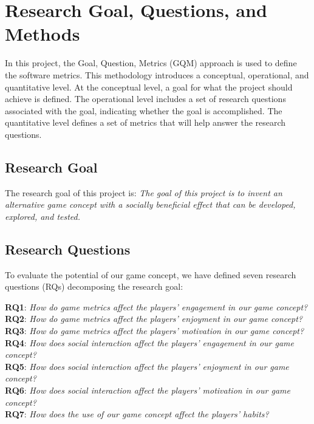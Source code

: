 \section{Research Goal, Questions, and Methods}
\label{chap:rqm}
In this project, the Goal, Question, Metrics (GQM) approach \citep{basili_software_1992} is used to define the software metrics. This methodology introduces a conceptual, operational, and quantitative level. At the conceptual level, a goal for what the project should achieve is defined. The operational level includes a set of research questions associated with the goal, indicating whether the goal is accomplished. The quantitative level defines a set of metrics that will help answer the research questions.

\subsection{Research Goal}
\label{sec:research_goal}
The research goal of this project is:
\textit{The goal of this project is to invent an alternative game concept with a socially beneficial effect that can be developed, explored, and tested.}

\subsection{Research Questions}
\label{sec:research_questions}
To evaluate the potential of our game concept, we have defined seven research questions (RQs) decomposing the research goal:

\textbf{RQ1}: \textit{How do game metrics affect the players’ engagement in our game concept?}\\
\textbf{RQ2}: \textit{How do game metrics affect the players’ enjoyment in our game concept?}\\
\textbf{RQ3}: \textit{How do game metrics affect the players’ motivation in our game concept?}\\
\textbf{RQ4}: \textit{How does social interaction affect the players’ engagement in our game concept?}\\
\textbf{RQ5}: \textit{How does social interaction affect the players’ enjoyment in our game concept?}\\
\textbf{RQ6}: \textit{How does social interaction affect the players’ motivation in our game concept?}\\
\textbf{RQ7}: \textit{How does the use of our game concept affect the players’ habits?}\\

